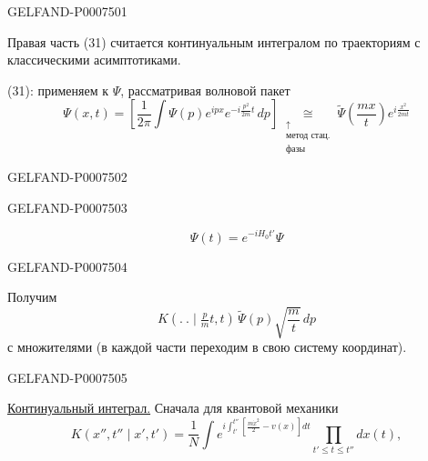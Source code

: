 \begin{GelfandAdjacentEvidence}{GELFAND-P000750}{1}

Правая часть (31) считается континуальным интегралом по траекториям с классическими асимптотиками.

 (31): применяем к \(\Psi\), рассматривая волновой пакет
\begin{equation*}
\Psi(x,t)=\left[\frac1{2\pi}\int\Psi(p)e^{ipx}e^{-i\frac{p^2}{2m}t}\,dp\right]
\underset{\substack{\uparrow\\\text{метод стац.}\\\text{фазы}}}{\cong}
\widetilde\Psi\left(\frac{mx}{t}\right)e^{i\frac{x^2}{2mt}}
\tag{32}
\end{equation*}
\end{GelfandAdjacentEvidence}
\begin{GelfandAdjacentEvidence}{GELFAND-P000750}{2}

\end{GelfandAdjacentEvidence}
\begin{GelfandAdjacentEvidence}{GELFAND-P000750}{3}

\[
\Psi(t)=e^{-iH_0t'}\Psi
\]
\end{GelfandAdjacentEvidence}
\begin{GelfandAdjacentEvidence}{GELFAND-P000750}{4}

Получим
\begin{equation*}
K(.\ .\mid\tfrac{p}{m}t,t)\,\widetilde\Psi(p)\sqrt{\frac mt}\,dp
\tag{33}
\end{equation*}
с множителями (в каждой части переходим в свою систему координат).
\end{GelfandAdjacentEvidence}
\begin{GelfandAdjacentEvidence}{GELFAND-P000750}{5}


\underline{Континуальный интеграл.} Сначала для квантовой механики
\begin{equation*}
K(x'',t''\mid x',t')=\frac1N\int
e^{i\int_{t'}^{t''}\left[\frac{m\dot x^2}{2}-v(x)\right]dt}
\prod_{t'\leq t\leq t''}dx(t),
\tag{34}
\end{equation*}
\end{GelfandAdjacentEvidence}
